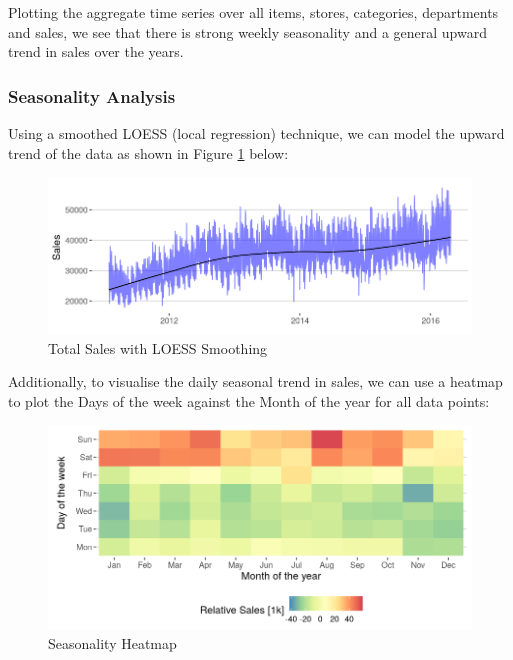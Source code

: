 \documentclass[12pt]{article}
\begin{document}
\noindent Plotting the aggregate time series over all items, stores, categories, departments and sales, we see that there is strong weekly seasonality and a general upward trend in sales over the years. 

\subsubsection*{Seasonality Analysis}

Using a smoothed LOESS (local regression) technique, we can model the upward trend of the data as shown in Figure \ref{fig:6-loessgraph} below: 

\begin{figure}[H]
    \centering
    \includegraphics[width=\textwidth]{Images/loessfit.png}
    \caption{Total Sales with LOESS Smoothing}
    \label{fig:6-loessgraph}
\end{figure} 

Additionally, to visualise the daily seasonal trend in sales, we can use a heatmap to plot the Days of the week against the Month of the year for all data points: 

\begin{figure}[H]
    \centering
    \includegraphics[width=\textwidth]{Images/seasonalityday.png}
    \caption{Seasonality Heatmap}
    \label{fig:6-seasonalityplot}
\end{figure} 
\end{document}
